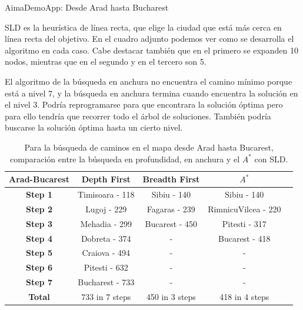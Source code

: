 \documentclass[11pt, a4paper, spanish, openright, twoside]{book}
\begin{document}
\begin{section}{AimaDemoApp: Desde Arad hasta Bucharest}


	
SLD es la heurística de línea recta, que elige la ciudad que está más cerca en línea recta del objetivo. En el cuadro adjunto podemos ver como se desarrolla el algoritmo en cada caso. Cabe destacar también que en el primero se expanden 10 nodos, mientras que en el segundo y en el tercero son 5.

El algoritmo de la búsqueda en anchura no encuentra el camino mínimo porque está a nivel 7, y la búsqueda en anchura termina cuando encuentra la solución en el nivel 3. Podría reprogramarse para que encontrara la solución óptima pero para ello tendría que recorrer 
todo el árbol de soluciones. También podría buscarse la solución óptima hasta un cierto nivel. 

	\begin{table}	
		\begin{center}
			\begin{tabular}{|c||c|c|c|c|}
				\hline \textbf{Arad-Bucarest}	& \textbf{Depth First} 	& \textbf{Breadth First} 	& $A^*$ \\ \hline \hline
				\textbf{Step 1} 			&  	Timisoara - 118	& Sibiu - 140			& Sibiu - 140			\\ \hline 
				\textbf{Step 2} 			&  	Lugoj - 229		& Fagaras - 239		& RimnicuVilcea - 220	\\ \hline 
				\textbf{Step 3} 			&  	Mehadia - 299		& Bucarest - 450		& Pitesti - 317			\\ \hline 
				\textbf{Step 4} 			&  	Dobreta - 374		& -					& Bucarest - 418		\\ \hline 
				\textbf{Step 5} 			&  	Craiova - 494		& -					& -					\\ \hline 
				\textbf{Step 6} 			&  	Pitesti - 632		& -					& - 					\\ \hline 
				\textbf{Step 7} 			&  	Bucharest - 733	& -					& -					\\ \hline \hline
				\textbf{Total} 			&  	733 in 7 steps		&  450 in 3 steps		& 418 in 4 steps		\\ \hline 

			\end{tabular}
		\caption{Para la búsqueda de caminos en el mapa desde Arad hasta Bucarest, comparación entre la búsqueda en profundidad, en anchura y el $A^*$ con SLD.}
		\end{center}
	\end{table}


\end{section}
\end{document}
